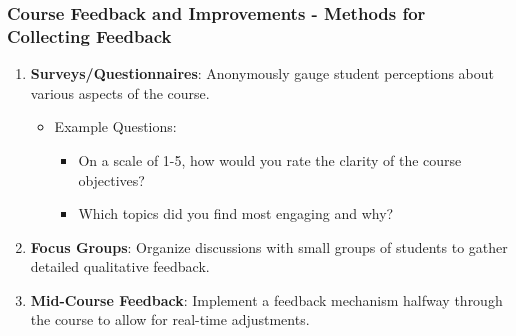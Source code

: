\documentclass[aspectratio=169]{beamer}
\begin{document}
\begin{frame}[fragile]
    \frametitle{Course Feedback and Improvements - Methods for Collecting Feedback}
    \begin{enumerate}
        \item \textbf{Surveys/Questionnaires}: Anonymously gauge student perceptions about various aspects of the course.
            \begin{itemize}
                \item Example Questions:
                    \begin{itemize}
                        \item On a scale of 1-5, how would you rate the clarity of the course objectives?
                        \item Which topics did you find most engaging and why?
                    \end{itemize}
            \end{itemize}
        \item \textbf{Focus Groups}: Organize discussions with small groups of students to gather detailed qualitative feedback.
        \item \textbf{Mid-Course Feedback}: Implement a feedback mechanism halfway through the course to allow for real-time adjustments.
    \end{enumerate}
\end{frame}
\end{document}
